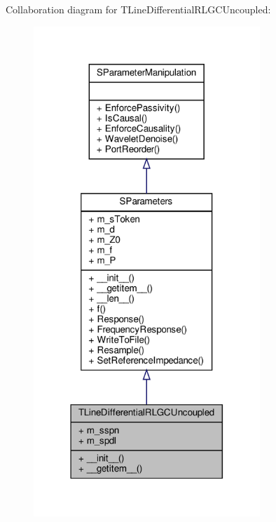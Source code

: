 Collaboration diagram for T\+Line\+Differential\+R\+L\+G\+C\+Uncoupled\+:
\nopagebreak
\begin{figure}[H]
\begin{center}
\leavevmode
\includegraphics[width=242pt]{classSignalIntegrity_1_1SParameters_1_1Devices_1_1TLineDifferentialRLGCUncoupled_1_1TLineDifferentialRLGCUncoupled__coll__graph}
\end{center}
\end{figure}
